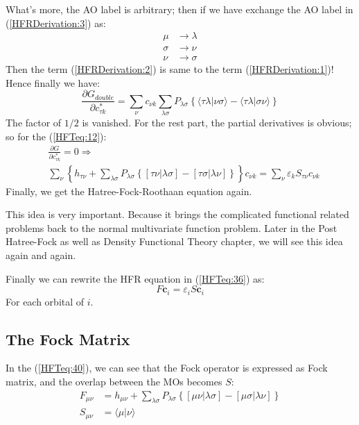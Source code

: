 What's more, the AO label is arbitrary; then if we have exchange the AO label
in (\ref{HFRDerivation:3}) as:
\begin{align}
 \mu&\rightarrow\lambda \nonumber \\
\sigma&\rightarrow\nu\nonumber \\
\nu&\rightarrow\sigma
\end{align}
Then the term (\ref{HFRDerivation:2}) is same to the term
(\ref{HFRDerivation:1})! Hence finally we have:
\begin{equation}\label{HFRDerivation:final}
  \frac{\partial G_{double}}{\partial c^{*}_{\tau k}} =  \sum_{\nu}c_{\nu
k}\sum_{\lambda\sigma}P_{\lambda\sigma}
    \left \{ \langle\tau\lambda|\nu\sigma\rangle -
\langle\tau\lambda|\sigma\nu\rangle
    \right \}
\end{equation}
The factor of $1/2$ is vanished. For the rest part, the partial derivatives is
obvious; so for the (\ref{HFTeq:12}):
\begin{align}
 &\frac{\partial G}{\partial c^{*}_{\tau k}} = 0 \Longrightarrow \nonumber \\
&\sum_{\nu}  \left \{
    h_{\tau \nu} +
    \sum_{\lambda\sigma}P_{\lambda\sigma}
    \left \{ [\tau\nu | \lambda\sigma] - [\tau\sigma|\lambda\nu]
    \right \} \right \}c_{\nu k} = \sum_{\nu}
    \varepsilon_{k}S_{\tau\nu}c_{\nu k}
\end{align}
Finally, we get the Hatree-Fock-Roothaan equation again.

This idea is very important. Because it brings the complicated functional
related problems back to the normal multivariate function problem. Later in the
Post Hatree-Fock as well as Density Functional Theory chapter, we will see this
idea again and again.

Finally we can rewrite the HFR equation in (\ref{HFTeq:36}) as:
\begin{equation}\label{HFTeq:40}
 F\bm{c}_{i} = \varepsilon_{i}S\bm{c}_{i}
\end{equation}
For each orbital of $i$.


\subsection{The Fock Matrix}
%
%
%
In the (\ref{HFTeq:40}), we can see that the Fock operator is expressed as Fock
matrix, and the overlap between the MOs becomes $S$:
\begin{align}\label{HFTeq:41}
F_{\mu\nu} &= h_{\mu \nu} +
    \sum_{\lambda\sigma}P_{\lambda\sigma}
    \left \{ [\mu\nu | \lambda\sigma] - [\mu\sigma|\lambda\nu]
    \right \} \nonumber \\
S_{\mu\nu} &= \langle \mu|\nu \rangle
\end{align}

